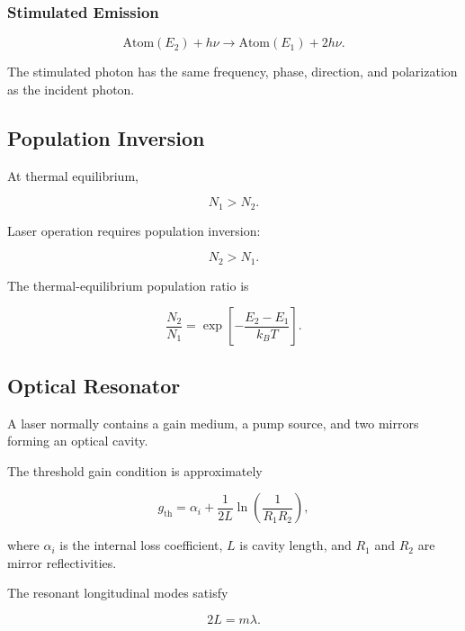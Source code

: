 \documentclass[12pt]{article}
\begin{document}
\subsubsection{Stimulated Emission}

\begin{equation}
\mathrm{Atom}(E_2)+h\nu
\rightarrow
\mathrm{Atom}(E_1)+2h\nu.
\end{equation}

The stimulated photon has the same frequency, phase, direction, and polarization as the incident photon.

\subsection{Population Inversion}

At thermal equilibrium,

\begin{equation}
N_1>N_2.
\end{equation}

Laser operation requires population inversion:

\begin{equation}
\boxed{N_2>N_1}.
\end{equation}

The thermal-equilibrium population ratio is

\begin{equation}
\frac{N_2}{N_1}
=
\exp\left[-\frac{E_2-E_1}{k_BT}\right].
\end{equation}

\subsection{Optical Resonator}

A laser normally contains a gain medium, a pump source, and two mirrors forming an optical cavity.

The threshold gain condition is approximately

\begin{equation}
\boxed{
g_{\mathrm{th}}
=
\alpha_i
+
\frac{1}{2L}
\ln\left(\frac{1}{R_1R_2}\right)
},
\end{equation}

where $\alpha_i$ is the internal loss coefficient, $L$ is cavity length, and $R_1$ and $R_2$ are mirror reflectivities.

The resonant longitudinal modes satisfy

\begin{equation}
2L=m\lambda.
\end{equation}
\end{document}
